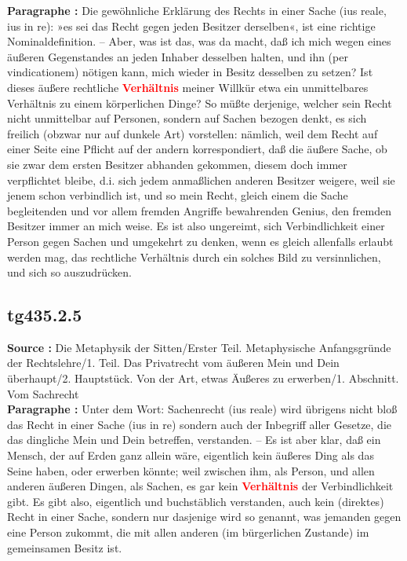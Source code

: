 \documentclass[a4paper,12pt,twoside]{book}
\newcommand{\match}[1]{\textcolor{red}{\textbf{#1}}}
\begin{document}
	\textbf{Paragraphe : }Die gewöhnliche Erklärung des Rechts in einer Sache (ius reale, ius in re): »es sei das Recht gegen jeden Besitzer derselben«, ist eine richtige Nominaldefinition. – Aber, was ist das, was da macht, daß ich mich wegen eines äußeren Gegenstandes an jeden Inhaber desselben halten, und ihn (per vindicationem) nötigen kann, mich wieder in Besitz desselben zu setzen? Ist dieses äußere rechtliche \match{Verhältnis} meiner Willkür etwa ein unmittelbares Verhältnis zu einem körperlichen Dinge? So müßte derjenige, welcher sein Recht nicht unmittelbar auf Personen, sondern auf Sachen bezogen denkt, es sich freilich (obzwar nur auf dunkele Art) vorstellen: nämlich, weil dem Recht auf einer  Seite eine Pflicht auf der andern korrespondiert, daß die äußere Sache, ob sie zwar dem ersten Besitzer abhanden gekommen, diesem doch immer verpflichtet bleibe, d.i. sich jedem anmaßlichen anderen Besitzer weigere, weil sie jenem schon verbindlich ist, und so mein Recht, gleich einem die Sache begleitenden und vor allem fremden Angriffe bewahrenden Genius, den fremden Besitzer immer an mich weise. Es ist also ungereimt, sich Verbindlichkeit einer Person gegen Sachen und umgekehrt zu denken, wenn es gleich allenfalls erlaubt werden mag, das rechtliche Verhältnis durch ein solches Bild zu versinnlichen, und sich so auszudrücken. 
	
	\subsection*{tg435.2.5} 
	\textbf{Source : }Die Metaphysik der Sitten/Erster Teil. Metaphysische Anfangsgründe der Rechtslehre/1. Teil. Das Privatrecht vom äußeren Mein und Dein überhaupt/2. Hauptstück. Von der Art, etwas Äußeres zu erwerben/1. Abschnitt. Vom Sachrecht\\  
	
	\textbf{Paragraphe : }Unter dem Wort: Sachenrecht (ius reale) wird übrigens nicht bloß das Recht in einer Sache (ius in re) sondern auch der Inbegriff aller Gesetze, die das dingliche Mein und Dein betreffen, verstanden. – Es ist aber klar, daß ein Mensch, der auf Erden ganz allein wäre, eigentlich kein äußeres Ding als das Seine haben, oder erwerben könnte; weil zwischen ihm, als Person, und allen anderen äußeren Dingen, als Sachen, es gar kein \match{Verhältnis} der Verbindlichkeit gibt. Es gibt also, eigentlich und buchstäblich verstanden, auch kein (direktes) Recht in einer Sache, sondern nur dasjenige wird so genannt, was jemanden gegen eine Person zukommt, die mit allen anderen (im bürgerlichen Zustande) im gemeinsamen Besitz ist. 
	
\end{document}
